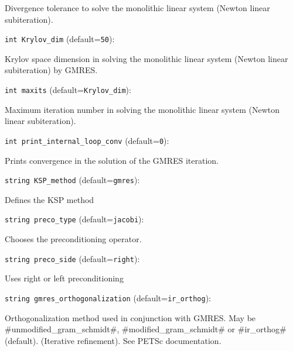 Divergence tolerance to solve the monolithic linear
system (Newton linear subiteration).

\item\verb+int Krylov_dim+ {\rm(default=\verb|50|)}:

Krylov space dimension in solving the monolithic linear
system (Newton linear subiteration) by GMRES.

\item\verb+int maxits+ {\rm(default=\verb|Krylov_dim|)}:

Maximum iteration number in solving the monolithic linear
system (Newton linear subiteration).

\item\verb+int print_internal_loop_conv+ {\rm(default=\verb|0|)}:

Prints convergence in the solution of the GMRES iteration. 

\item\verb+string KSP_method+ {\rm(default=\verb|gmres|)}:

Defines the KSP method

\item\verb+string preco_type+ {\rm(default=\verb|jacobi|)}:

Chooses the preconditioning operator. 

\item\verb+string preco_side+ {\rm(default=\verb|right|)}:

Uses right or left preconditioning

\item\verb+string gmres_orthogonalization+ {\rm(default=\verb|ir_orthog|)}:

Orthogonalization method used in conjunction with GMRES. 
May be  #unmodified_gram_schmidt#,
#modified_gram_schmidt# or #ir_orthog# (default). (Iterative refinement).
See PETSc documentation. 

